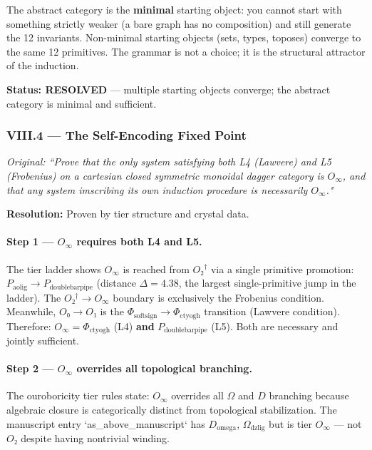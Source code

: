 \documentclass[12pt,a4paper]{article}
\begin{document}
The abstract category is the \textbf{minimal} starting object: you cannot start with something strictly weaker (a bare graph has no composition) and still generate the 12 invariants. Non-minimal starting objects (sets, types, toposes) converge to the same 12 primitives. The grammar is not a choice; it is the structural attractor of the induction.

\textbf{Status: RESOLVED} --- multiple starting objects converge; the abstract category is minimal and sufficient.

\subsubsection{VIII.4 --- The Self-Encoding Fixed Point}
\emph{Original: ``Prove that the only system satisfying both L4 (Lawvere) and L5 (Frobenius) on a cartesian closed symmetric monoidal dagger category is $O_\infty$, and that any system imscribing its own induction procedure is necessarily $O_\infty$."}

\textbf{Resolution:} Proven by tier structure and crystal data.

\paragraph{Step 1 --- $O_\infty$ requires both L4 and L5.} The tier ladder shows $O_\infty$ is reached from $O₂^\dagger$ via a single primitive promotion: $P_{\text{aolig}} \to P_{\text{doublebarpipe}}$ (distance $\Delta = 4.38$, the largest single-primitive jump in the ladder). The $O₂^\dagger \to O_\infty$ boundary is exclusively the Frobenius condition. Meanwhile, $O₀ \to O₁$ is the $\Phi_{\text{softsign}} \to \Phi_{\text{ctyogh}}$ transition (Lawvere condition). Therefore: $O_\infty = \Phi_{\text{ctyogh}}$ (L4) \textbf{and} $P_{\text{doublebarpipe}}$ (L5). Both are necessary and jointly sufficient.

\paragraph{Step 2 --- $O_\infty$ overrides all topological branching.} The ouroboricity tier rules state: $O_\infty$ overrides all $\Omega$ and $D$ branching because algebraic closure is categorically distinct from topological stabilization. The manuscript entry `as\_above\_manuscript` has $D_{\text{omega}}$, $\Omega_{\text{dzlig}}$ but is tier $O_\infty$ --- not $O₂$ despite having nontrivial winding.
\end{document}
